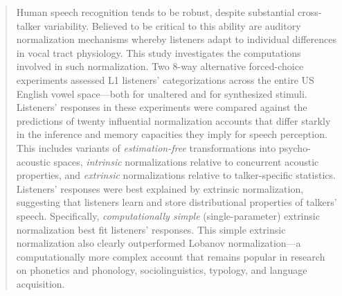 \documentclass[preprint]{JASA}
\begin{document}
\begin{abstract}
Human speech recognition tends to be robust, despite substantial cross-talker variability. Believed to be critical to this ability are auditory normalization mechanisms whereby listeners adapt to individual differences in vocal tract physiology. This study investigates the computations involved in such normalization. Two 8-way alternative forced-choice experiments assessed L1 listeners' categorizations across the entire US English vowel space---both for unaltered and for synthesized stimuli. Listeners' responses in these experiments were compared against the predictions of twenty influential normalization accounts that differ starkly in the inference and memory capacities they imply for speech perception. This includes variants of \emph{estimation-free} transformations into psycho-acoustic spaces, \emph{intrinsic} normalizations relative to concurrent acoustic properties, and \emph{extrinsic} normalizations relative to talker-specific statistics. Listeners' responses were best explained by extrinsic normalization, suggesting that listeners learn and store distributional properties of talkers' speech. Specifically, \emph{computationally simple} (single-parameter) extrinsic normalization best fit listeners' responses. This simple extrinsic normalization also clearly outperformed Lobanov normalization---a computationally more complex account that remains popular in research on phonetics and phonology, sociolinguistics, typology, and language acquisition.
\end{abstract}


\maketitle




\setcounter{secnumdepth}{5}
\setcounter{page}{1}
\setcounter{section}{0}
\end{document}
